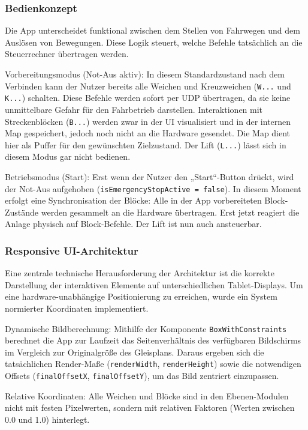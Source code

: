 \documentclass{article}
\begin{document}
\subsubsection{Bedienkonzept}
Die App unterscheidet funktional zwischen dem Stellen von Fahrwegen und dem Auslösen von Bewegungen.
Diese Logik steuert, welche Befehle tatsächlich an die Steuerrechner übertragen werden.

Vorbereitungsmodus (Not-Aus aktiv):
In diesem Standardzustand nach dem Verbinden kann der Nutzer bereits alle Weichen und Kreuzweichen (\texttt{W...} und \texttt{K...}) schalten.
Diese Befehle werden sofort per UDP übertragen, da sie keine unmittelbare Gefahr für den Fahrbetrieb darstellen.
Interaktionen mit Streckenblöcken (\texttt{B...}) werden zwar in der UI visualisiert und in der internen Map gespeichert, jedoch noch nicht an die Hardware gesendet.
Die Map dient hier als Puffer für den gewünschten Zielzustand. Der Lift (\texttt{L...}) lässt sich in diesem Modus gar nicht bedienen.

Betriebsmodus (Start):
Erst wenn der Nutzer den „Start“-Button drückt, wird der Not-Aus aufgehoben (\texttt{isEmergencyStopActive = false}).
In diesem Moment erfolgt eine Synchronisation der Blöcke: Alle in der App vorbereiteten Block-Zustände werden gesammelt an die Hardware übertragen.
Erst jetzt reagiert die Anlage physisch auf Block-Befehle. Der Lift ist nun auch ansteuerbar.


\subsubsection{Responsive UI-Architektur}
Eine zentrale technische Herausforderung der Architektur ist die korrekte Darstellung der interaktiven Elemente auf unterschiedlichen Tablet-Displays.
Um eine hardware-unabhängige Positionierung zu erreichen, wurde ein System normierter Koordinaten implementiert.

Dynamische Bildberechnung:
Mithilfe der Komponente \texttt{BoxWithConstraints} berechnet die App zur Laufzeit das Seitenverhältnis des verfügbaren Bildschirms im Vergleich zur Originalgröße des Gleisplans.
Daraus ergeben sich die tatsächlichen Render-Maße (\texttt{renderWidth}, \texttt{renderHeight}) sowie die notwendigen Offsets  (\texttt{final\-OffsetX}, \texttt{finalOffsetY}), um das Bild zentriert einzupassen.

Relative Koordinaten:
Alle Weichen und Blöcke sind in den Ebenen-Modulen nicht mit festen Pixelwerten, sondern mit relativen Faktoren (Werten zwischen 0.0 und 1.0) hinterlegt.
\end{document}
